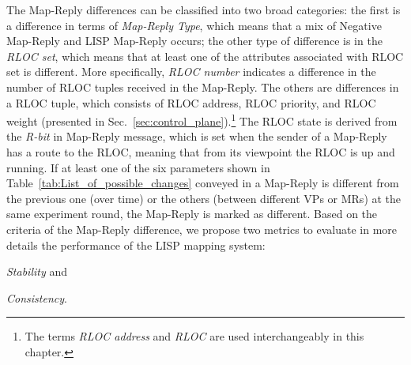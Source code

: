 \begin{table}[!t]
	\centering
	\caption{Map-Reply Differences}
	\label{tab:List_of_possible_changes}{
	}
\end{table}


The Map-Reply differences can be classified into two broad categories: the first is a difference in terms of \emph{Map-Reply Type}, which means that a mix of Negative Map-Reply and LISP Map-Reply occurs; the other type of difference is in the \emph{RLOC set}, which means that at least one of the attributes associated with RLOC set is different. More specifically, \emph{RLOC number} indicates a difference in the number of RLOC tuples received in the Map-Reply. The others are differences in a RLOC tuple, which consists of RLOC address, RLOC priority, and RLOC weight (presented in Sec.~\ref{sec:control_plane}).\footnote{The terms \emph{RLOC address} and \emph{RLOC} are used interchangeably in this chapter.} The RLOC state is derived from the \emph{R-bit} in Map-Reply message, which is set when the sender of a Map-Reply has a route to the RLOC, meaning that from its viewpoint the RLOC is up and running.  If at least one of the six parameters shown in Table~\ref{tab:List_of_possible_changes} conveyed in a Map-Reply is different from the previous one (over time) or the others (between different VPs or MRs) at the same experiment round, the Map-Reply is marked as different. Based on the criteria of the Map-Reply difference, we propose two metrics to evaluate in more details the performance of the LISP mapping system:
\begin{inparaenum}[(i)]
	\item \emph{Stability} and 
	\item \emph{Consistency}. 
\end{inparaenum}

